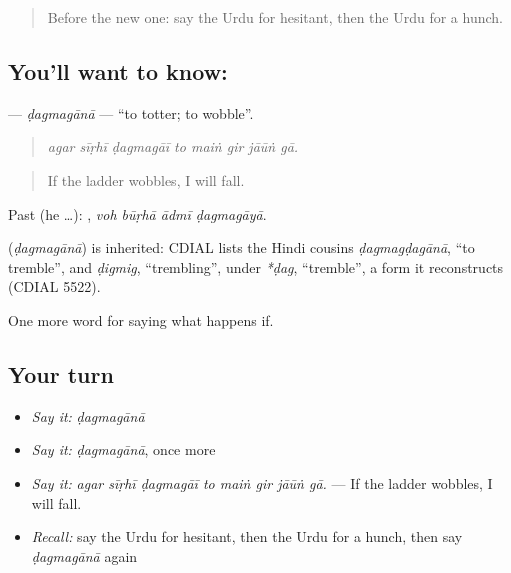 \label{lesson:UR-C538-dagmagana}



\begin{quote}
Before the new one: say the Urdu for hesitant, then the Urdu for a hunch.
\end{quote}

\subsection*{You'll want to know: }
\textbf{} — \emph{ḍagmagānā} — \textquotedblleft{}to totter; to wobble\textquotedblright{}.

\begin{quote}
       
\end{quote}

\begin{quote}
\emph{agar sīṛhī ḍagmagāī to maiṅ gir jāūṅ gā.}
\end{quote}

\begin{quote}
If the ladder wobbles, I will fall.
\end{quote}

Past (he …):    , \emph{voh būṛhā ādmī ḍagmagāyā}.

\begin{cousinweb}
\textbf{} (\emph{ḍagmagānā}) is inherited: CDIAL lists the Hindi cousins \emph{ḍagmagḍagānā}, \textquotedblleft{}to tremble\textquotedblright{}, and \emph{ḍigmig}, \textquotedblleft{}trembling\textquotedblright{}, under \emph{*ḍag}, \textquotedblleft{}tremble\textquotedblright{}, a form it reconstructs (CDIAL 5522).
\end{cousinweb}

\begin{grammarlens}[title={What you've built}]
One more word for saying what happens if.
\end{grammarlens}

\subsection*{Your turn}
\begin{itemize}
\raggedright
  \item \emph{Say it:} \emph{ḍagmagānā}
  \item \emph{Say it:} \emph{ḍagmagānā}, once more
  \item \emph{Say it:} \emph{agar sīṛhī ḍagmagāī to maiṅ gir jāūṅ gā.} — If the ladder wobbles, I will fall.
  \item \emph{Recall:} say the Urdu for hesitant, then the Urdu for a hunch, then say \emph{ḍagmagānā} again
\end{itemize}


